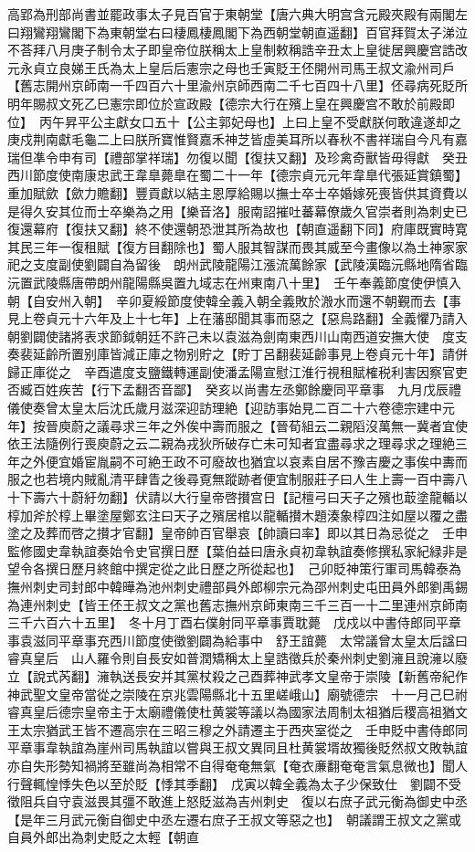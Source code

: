 高郢為刑部尚書並罷政事太子見百官于東朝堂【唐六典大明宫含元殿夾殿有兩閣左曰翔鸞翔鸞閣下為東朝堂右曰棲鳳棲鳳閣下為西朝堂朝直遥翻】百官拜賀太子涕泣不荅拜八月庚子制令太子即皇帝位朕稱太上皇制敕稱誥辛丑太上皇徙居興慶宫誥改元永貞立良娣王氏為太上皇后后憲宗之母也壬寅貶王伾開州司馬王叔文渝州司戶【舊志開州京師南一千四百六十里渝州京師西南二千七百四十八里】伾尋病死貶所明年賜叔文死乙巳憲宗即位於宣政殿【德宗大行在殯上皇在興慶宫不敢於前殿即位】　丙午昇平公主獻女口五十【公主郭妃母也】上曰上皇不受獻朕何敢違遂却之庚戍荆南獻毛龜二上曰朕所寶惟賢嘉禾神芝皆虛美耳所以春秋不書祥瑞自今凡有嘉瑞但凖令申有司【禮部掌祥瑞】勿復以聞【復扶又翻】及珍禽奇獸皆毋得獻　癸丑西川節度使南康忠武王韋臯薨臯在蜀二十一年【德宗貞元元年韋臯代張延賞鎮蜀】重加賦歛【歛力贍翻】豐貢獻以結主恩厚給賜以撫士卒士卒婚嫁死喪皆供其資費以是得久安其位而士卒樂為之用【樂音洛】服南詔摧吐蕃幕僚歲久官崇者則為刺史已復還幕府【復扶又翻】終不使還朝恐泄其所為故也【朝直遥翻下同】府庫既實時寛其民三年一復租賦【復方目翻除也】蜀人服其智謀而畏其威至今畫像以為土神家家祀之支度副使劉闢自為留後　朗州武陵龍陽江漲流萬餘家【武陵漢臨沅縣地隋省臨沅置武陵縣唐帶朗州龍陽縣吳置九域志在州東南八十里】　壬午奉義節度使伊慎入朝【自安州入朝】　辛卯夏綏節度使韓全義入朝全義敗於溵水而還不朝覲而去【事見上卷貞元十六年及上十七年】上在藩邸聞其事而惡之【惡烏路翻】全義懼乃請入朝劉闢使諸將表求節鉞朝廷不許己未以袁滋為劍南東西川山南西道安撫大使　度支奏裴延齡所置别庫皆減正庫之物别貯之【貯丁呂翻裴延齡事見上卷貞元十年】請併歸正庫從之　辛酉遣度支鹽鐵轉運副使潘孟陽宣慰江淮行視租賦榷税利害因察官吏否臧百姓疾苦【行下孟翻否音鄙】　癸亥以尚書左丞鄭餘慶同平章事　九月戊辰禮儀使奏曾太皇太后沈氏歲月滋深迎訪理絶【迎訪事始見二百二十六卷德宗建中元年】按晉庾蔚之議尋求三年之外俟中壽而服之【晉荀組云二親䧟沒萬無一冀者宜使依王法隨例行喪庾蔚之云二親為戎狄所破存亡未可知者宜盡尋求之理尋求之理絶三年之外便宜婚宦胤嗣不可絶王政不可廢故也猶宜以哀素自居不豫吉慶之事俟中夀而服之也若境内賊亂清平肆眚之後尋覔無蹤跡者便宜制服莊子曰人生上壽一百中壽八十下壽六十蔚紆勿翻】伏請以大行皇帝啓攅宫日【記檀弓曰天子之殯也菆塗龍輴以椁加斧於椁上畢塗屋鄭玄注曰天子之殯居棺以龍輴攅木題湊象椁四注如屋以覆之盡塗之及葬而啓之攅才官翻】皇帝帥百官舉哀【帥讀曰率】即以其日為忌從之　壬申監修國史韋執誼奏始令史官撰日歷【葉伯益曰唐永貞初韋執誼奏修撰私家紀緑非是望令各撰日歷月終館中撰定從之此日歷之所從起也】　己卯貶神策行軍司馬韓泰為撫州刺史司封郎中韓曄為池州刺史禮部員外郎柳宗元為邵州刺史屯田員外郎劉禹錫為連州刺史【皆王伾王叔文之黨也舊志撫州京師東南三千三百一十二里連州京師南三千六百六十五里】　冬十月丁酉右僕射同平章事賈耽薨　戊戍以中書侍郎同平章事袁滋同平章事充西川節度使徵劉闢為給事中　舒王誼薨　太常議曾太皇太后諡曰睿真皇后　山人羅令則自長安如普潤矯稱太上皇誥徵兵於秦州刺史劉澭且說澭以廢立【說式芮翻】澭執送長安并其黨杖殺之己酉葬神武孝文皇帝于崇陵【新舊帝紀作神武聖文皇帝當從之崇陵在京兆雲陽縣北十五里嵯峨山】廟號德宗　十一月己巳祔睿真皇后德宗皇帝主于太廟禮儀使杜黄裳等議以為國家法周制太祖猶后稷高祖猶文王太宗猶武王皆不遷高宗在三昭三穆之外請遷主于西夾室從之　壬申貶中書侍郎同平章事韋執誼為崖州司馬執誼以嘗與王叔文異同且杜黄裳壻故獨後貶然叔文敗執誼亦自失形勢知禍將至雖尚為相常不自得奄奄無氣【奄衣亷翻奄奄言氣息微也】聞人行聲輒惶悸失色以至於貶【悸其季翻】　戊寅以韓全義為太子少保致仕　劉闢不受徵阻兵自守袁滋畏其彊不敢進上怒貶滋為吉州刺史　復以右庶子武元衡為御史中丞【是年三月武元衡自御史中丞左遷右庶子王叔文等惡之也】　朝議謂王叔文之黨或自員外郎出為刺史貶之太輕【朝直